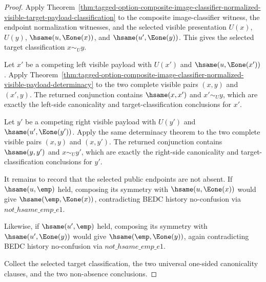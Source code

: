 \begin{proof}
Apply
Theorem~\ref{thm:tagged-option-composite-image-classifier-normalized-visible-target-payload-classification}
to the composite image-classifier witness, the endpoint normalization witnesses,
and the selected visible presentation $U(x)$, $U(y)$,
$\hsame(u,\Eone(x))$, and $\hsame(u',\Eone(y))$. This gives the selected target
classification $x\sim_U y$.

Let $x'$ be a competing left visible payload with $U(x')$ and
$\hsame(u,\Eone(x'))$. Apply
Theorem~\ref{thm:tagged-option-composite-image-classifier-normalized-visible-payload-determinacy}
to the two complete visible pairs $(x,y)$ and $(x',y)$. The returned
conjunction contains $\hsame(x,x')$ and $x'\sim_U y$, which are exactly the
left-side canonicality and target-classification conclusions for $x'$.

Let $y'$ be a competing right visible payload with $U(y')$ and
$\hsame(u',\Eone(y'))$. Apply the same determinacy theorem to the two complete
visible pairs $(x,y)$ and $(x,y')$. The returned conjunction contains
$\hsame(y,y')$ and $x\sim_U y'$, which are exactly the right-side canonicality
and target-classification conclusions for $y'$.

It remains to record that the selected public endpoints are not absent. If
$\hsame(u,\emp)$ held, composing its symmetry with $\hsame(u,\Eone(x))$ would
give $\hsame(\emp,\Eone(x))$, contradicting BEDC history no-confusion via
$not\_hsame\_emp\_e1$.

Likewise, if $\hsame(u',\emp)$ held, composing its symmetry with
$\hsame(u',\Eone(y))$ would give $\hsame(\emp,\Eone(y))$, again contradicting
BEDC history no-confusion via $not\_hsame\_emp\_e1$.

Collect the selected target classification, the two universal one-sided
canonicality clauses, and the two non-absence conclusions.
\end{proof}

